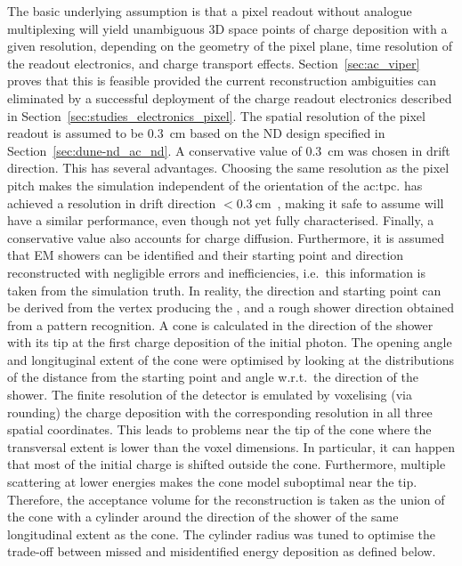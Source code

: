 The basic underlying assumption is that a pixel readout without analogue multiplexing will yield unambiguous 3D space points of charge deposition with a given resolution, depending on the geometry of the pixel plane, time resolution of the readout electronics, and charge transport effects.
Section~\ref{sec:ac_viper} proves that this is feasible provided the current reconstruction ambiguities can eliminated by a successful deployment of the \larpix{} charge readout electronics described in Section~\ref{sec:studies_electronics_pixel}.
The spatial resolution of the pixel readout is assumed to be \SI{0.3}{\centi\metre} based on the ND design specified in Section~\ref{sec:dune-nd_ac_nd}.
A conservative value of \SI{0.3}{\centi\meter} was chosen in drift direction.
This has several advantages.
Choosing the same resolution as the pixel pitch makes the simulation independent of the orientation of the \gls{ac:tpc}.
\uboone{} has achieved a resolution in drift direction $< \SI{0.3}{\centi\metre}$~\cite{uboone}, making it safe to assume \larpix{} will have a similar performance, even though not yet fully characterised.
Finally, a conservative value also accounts for charge diffusion.
Furthermore, it is assumed that EM showers can be identified and their starting point and direction reconstructed with negligible errors and inefficiencies, i.e.\ this information is taken from the simulation truth.
In reality, the direction and starting point can be derived from the vertex producing the \Pgpz, and a rough shower direction obtained from a pattern recognition.
A cone is calculated in the direction of the shower with its tip at the first charge deposition of the initial photon.
The opening angle and longituginal extent of the cone were optimised by looking at the distributions of the distance from the starting point and angle w.r.t.\ the direction of the shower.
The finite resolution of the detector is emulated by voxelising (via rounding) the charge deposition with the corresponding resolution in all three spatial coordinates.
This leads to problems near the tip of the cone where the transversal extent is lower than the voxel dimensions.
In particular, it can happen that most of the initial charge is shifted outside the cone.
Furthermore, multiple scattering at lower energies makes the cone model suboptimal near the tip.
Therefore, the acceptance volume for the reconstruction is taken as the union of the cone with a cylinder around the direction of the shower of the same longitudinal extent as the cone.
The cylinder radius was tuned to optimise the trade-off between missed and misidentified energy deposition as defined below.

